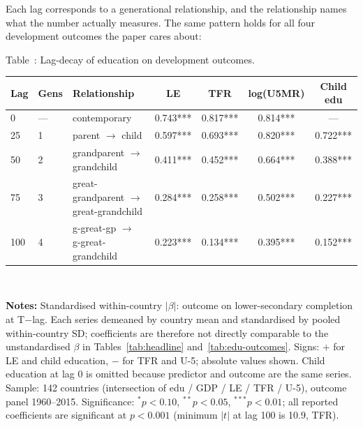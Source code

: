 \documentclass[12pt,letterpaper]{article}
\begin{document}
Each lag corresponds to a generational relationship, and the
relationship names what the number actually measures. The same pattern
holds for all four development outcomes the paper cares about:

\label{tab:lag-decay}Table~\thetable: Lag-decay of education on development outcomes.

\begin{center}
\footnotesize
\begin{tabular}{@{}llp{4.4cm}cccc@{}}
\toprule
Lag & Gens & Relationship & LE & TFR & log(U5MR) & Child edu \\
\midrule
0   & ---  & contemporary                                 & 0.743*** & 0.817*** & 0.814*** & --- \\
25  & 1    & parent $\to$ child                           & 0.597*** & 0.693*** & 0.820*** & 0.722*** \\
50  & 2    & grandparent $\to$ grandchild                 & 0.411*** & 0.452*** & 0.664*** & 0.388*** \\
75  & 3    & great-grandparent $\to$ great-grandchild     & 0.284*** & 0.258*** & 0.502*** & 0.227*** \\
100 & 4    & g-great-gp $\to$ g-great-grandchild          & 0.223*** & 0.134*** & 0.395*** & 0.152*** \\
\bottomrule
\end{tabular}\\[2pt]
\begin{minipage}{\dimexpr\textwidth-2em}
\scriptsize
\textbf{Notes:} Standardised within-country $|\beta|$: outcome on
lower-secondary completion at T$-$lag. Each series demeaned by
country mean and standardised by pooled within-country SD; coefficients
are therefore not directly comparable to the unstandardised $\beta$ in
Tables~\ref{tab:headline} and~\ref{tab:edu-outcomes}. Signs: $+$ for LE and child
education, $-$ for TFR and U-5; absolute values shown. Child education
at lag 0 is omitted because predictor and outcome are the same series.
Sample: 142 countries (intersection of edu / GDP / LE / TFR / U-5),
outcome panel 1960--2015. Significance: $^{*}p<0.10$, $^{**}p<0.05$,
$^{***}p<0.01$; all reported coefficients are significant at $p<0.001$
(minimum $|t|$ at lag 100 is 10.9, TFR).
\end{minipage}
\end{center}
\end{document}
